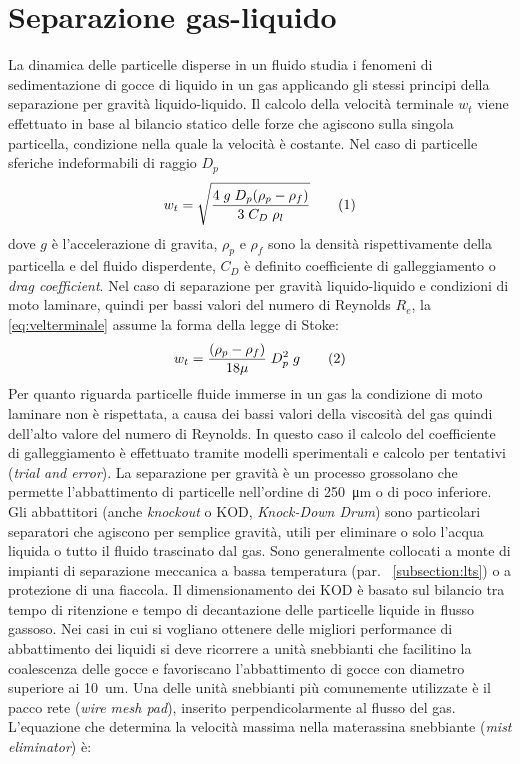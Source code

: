 \section{Separazione gas-liquido}
La dinamica delle particelle disperse in un fluido studia i fenomeni di sedimentazione di gocce di liquido in un gas applicando gli stessi principi della separazione per gravità liquido-liquido. Il calcolo della velocità terminale \(w_t\) viene effettuato in base al bilancio statico delle forze che agiscono sulla singola particella, condizione nella quale la velocità è costante. Nel caso di particelle sferiche indeformabili di raggio \(D_p\)
\[w_t=\sqrt{\dfrac{4 \; g \; D_p(\rho_p-\rho_f)}{3 \; C_D \; \rho_l}} \addtag \label{eq:velterminale}\]
dove \(g\) è l'accelerazione di gravita, \(\rho_p\) e \(\rho_f\) sono la densità rispettivamente della particella e del fluido disperdente, \(C_D\) è definito coefficiente di galleggiamento o \textit{drag coefficient}. Nel caso di separazione per gravità liquido-liquido e condizioni di moto laminare, quindi per bassi valori del numero di Reynolds \(R_e\), la \eqref{eq:velterminale} assume la forma della legge di Stoke:
\[w_t= \dfrac{(\rho_p-\rho_f)}{18\mu} \; D_p^2\; g \addtag \label{eq:stoke}\]
Per quanto riguarda particelle fluide immerse in un gas la condizione di moto laminare non è rispettata, a causa dei bassi valori della viscosità del gas quindi dell'alto valore del numero di Reynolds. In questo caso il calcolo del coefficiente di galleggiamento è effettuato tramite modelli sperimentali e calcolo per tentativi (\textit{trial and error}). La separazione per gravità è un processo grossolano che permette l'abbattimento di particelle nell'ordine di \SI{250}{\um} o di poco inferiore. Gli abbattitori (anche \textit{knockout} o KOD, \textit{Knock-Down Drum}) sono particolari separatori che agiscono per semplice gravità, utili per eliminare o solo l'acqua liquida o tutto il fluido trascinato dal gas. Sono generalmente collocati a monte di impianti di separazione meccanica a bassa temperatura (par. ~\ref{subsection:lts}) o a protezione di una fiaccola. Il dimensionamento dei KOD è basato sul bilancio tra tempo di ritenzione e tempo di decantazione delle particelle liquide in flusso gassoso.
Nei casi in cui si vogliano ottenere delle migliori performance di abbattimento dei liquidi si deve ricorrere a unità snebbianti che facilitino la coalescenza delle gocce e favoriscano l'abbattimento di gocce con diametro superiore ai \SI{10}{um}. Una delle unità snebbianti più comunemente utilizzate è il pacco rete (\textit{wire mesh pad}), inserito perpendicolarmente al flusso del gas. L'equazione che determina la velocità massima nella materassina snebbiante (\textit{mist eliminator}) è:
